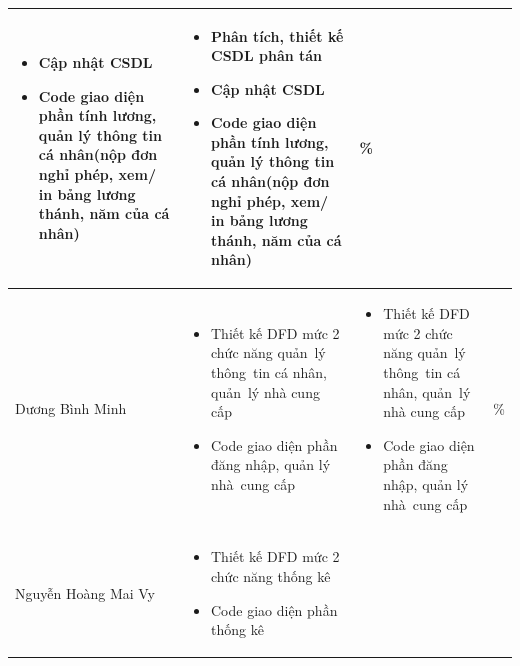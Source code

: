 \documentclass[a4paper,12pt]{report}
\begin{document}
\begin{center}
\begin{longtable}{|>{\centering\arraybackslash}p{3cm}|
        >{\centering\arraybackslash}p{5.5cm}|
        >{\centering\arraybackslash}p{5.5cm}|
        >{\centering\arraybackslash}p{1.5cm}|}
\begin{itemize}
            \item Cập nhật CSDL
            \item Code giao diện phần tính lương, quản lý thông tin cá nhân(nộp đơn nghỉ phép, xem/ in bảng lương thánh, năm của cá nhân)
        \end{itemize} &
        \begin{itemize}
            \item Phân tích, thiết kế CSDL phân tán
            \item Cập nhật CSDL
            \item Code giao diện phần tính lương, quản lý thông tin cá nhân(nộp đơn nghỉ phép, xem/ in bảng lương thánh, năm của cá nhân)
        \end{itemize}
                                                                                                                                      & 100\% \\
        \hline
        Dương Bình Minh                                                                                                               &
        \begin{itemize}
        \item Thiết kế DFD mức 2 chức năng quản~lý thông~tin cá nhân, quản~lý nhà cung cấp
            \item Code giao diện phần đăng nhập, quản lý nhà~cung cấp
        \end{itemize}
                                                                                                                                      &
        \begin{itemize}
            \item Thiết kế DFD mức 2 chức năng quản~lý thông~tin cá nhân, quản~lý nhà cung cấp
            \item Code giao diện phần đăng nhập, quản lý nhà~cung cấp
        \end{itemize}
                                                                                                                                      & 100\% \\
        \hline
        Nguyễn Hoàng Mai Vy                                                                                                           &
        \begin{itemize}
            \item Thiết kế DFD mức 2 chức năng thống kê
            \item Code giao diện phần thống kê
        \end{itemize}

\end{longtable}
\end{center}
\end{document}
